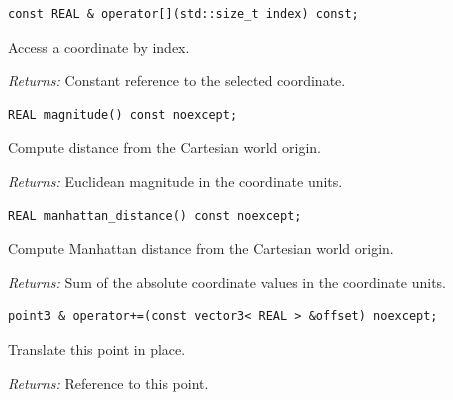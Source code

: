 \par\noindent\begin{minipage}{\linewidth}
\begin{lstlisting}[style=apireference]
const REAL & operator[](std::size_t index) const;
\end{lstlisting}
{\footnotesize Access a coordinate by index.\par}
{\footnotesize\textit{Returns:} Constant reference to the selected coordinate.\par}
\end{minipage}\par\vspace{1pt}
\par\noindent\begin{minipage}{\linewidth}
\begin{lstlisting}[style=apireference]
REAL magnitude() const noexcept;
\end{lstlisting}
{\footnotesize Compute distance from the Cartesian world origin.\par}
{\footnotesize\textit{Returns:} Euclidean magnitude in the coordinate units.\par}
\end{minipage}\par\vspace{1pt}
\par\noindent\begin{minipage}{\linewidth}
\begin{lstlisting}[style=apireference]
REAL manhattan_distance() const noexcept;
\end{lstlisting}
{\footnotesize Compute Manhattan distance from the Cartesian world origin.\par}
{\footnotesize\textit{Returns:} Sum of the absolute coordinate values in the coordinate units.\par}
\end{minipage}\par\vspace{1pt}
\par\noindent\begin{minipage}{\linewidth}
\begin{lstlisting}[style=apireference]
point3 & operator+=(const vector3< REAL > &offset) noexcept;
\end{lstlisting}
{\footnotesize Translate this point in place.\par}
{\footnotesize\textit{Returns:} Reference to this point.\par}
\end{minipage}\par\vspace{1pt}
